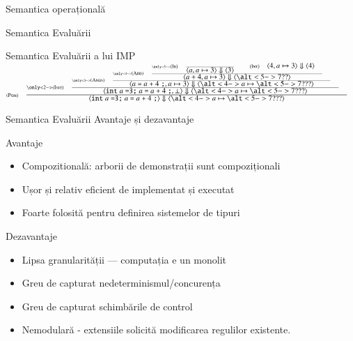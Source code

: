 \documentclass[xcolor=pdftex,romanian,colorlinks]{beamer}
\begin{document}
\begin{section}{Semantica operațională}
\begin{subsection}{Semantica Evaluării}
\begin{frame}{Semantica Evaluării a lui IMP}
$\reg[Pgm]{
  \S{\c{\terminal{int} a \terminal{=} \terminal{3} \terminal{;} a \terminal{=} a \terminal{+} 4 \terminal{;}}}{\c{\alt<4->{a\mapsto \alt<5->{7}{??}}{?}}}
 }{
   \only<2->{\reg[Init]{
     \S{\c{\terminal{int} a \terminal{=} \terminal{3} \terminal{;} a \terminal{=} a \terminal{+} 4 \terminal{;},\bottom}}{\c{\alt<4->{a\mapsto \alt<5->{7}{??}}{?}}}
   }{
     \only<3->{\reg[Asgn]{
	   \S{\c{a \terminal{=} a \terminal{+} 4 \terminal{;},a\mapsto 3}}{\c{\alt<4->{a\mapsto \alt<5->{7}{??}}{?}}}
	 }{
	   \only<4->{\reg[Add]{
	     \S{\c{a + 4,a \mapsto 3}}{\c{\alt<5->{7}{??}}}
	   }{
	     \only<5->{\reg[Id]{
		   \S{\c{a, a\mapsto 3}}{\c{3}}
		 }{
		 }{}\si \reg[Int]{
		   \S{\c{4, a\mapsto 3}}{\c{4}}
		 }{}{}}
	   }{}}
	 }{}}}{}}
	 }{}$
\end{frame}
\begin{frame}{Semantica Evaluării}
{Avantaje și dezavantaje}
\begin{block}{Avantaje}
\begin{itemize}
\item Compozitională: arborii de demonstrații sunt compoziționali
\item Ușor și relativ eficient de implementat și executat
\item Foarte folosită pentru definirea sistemelor de tipuri
\end{itemize}
\end{block}
\begin{alertblock}{Dezavantaje}
\begin{itemize}
\item Lipsa granularității --- computația e un monolit
\item Greu de capturat nedeterminismul/concurența
\item Greu de capturat schimbările de control
\item Nemodulară - extensiile solicită modificarea regulilor existente.
\end{itemize}
\end{alertblock}
\end{frame}

\end{subsection}

\end{section}
\end{document}
